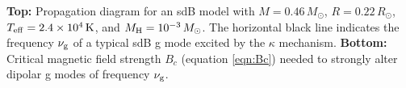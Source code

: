\label{fig:sdBProp}
{\bf Top:} Propagation diagram for an sdB model with $M=0.46 \, M_\odot$, $R= 0.22 \, R_\odot$, $T_{\rm eff} = 2.4 \times 10^4 \, {\rm K}$, and $M_{\rm H} = 10^{-3} \, M_\odot$. The horizontal black line indicates the frequency $\nu_{\rm g}$ of a typical sdB g mode excited by the $\kappa$ mechanism. {\bf Bottom:} Critical magnetic field strength $B_c$ (equation \ref{eqn:Bc}) needed to strongly alter dipolar g modes of frequency $\nu_{\rm g}$. 
  
  
  